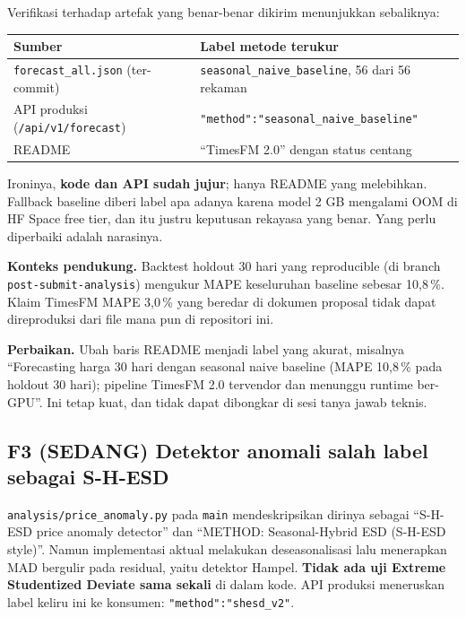 \documentclass[11pt,a4paper]{article}
\newcommand{\code}[1]{\texttt{\small #1}}
\newcommand{\sevM}{\textcolor{sevmed}{\textbf{SEDANG}}}
\begin{document}
\noindent
Verifikasi terhadap artefak yang benar-benar dikirim menunjukkan sebaliknya:

\begin{center}
\begin{tabular}{@{}p{6.4cm}p{8.6cm}@{}}
\toprule
\textbf{Sumber} & \textbf{Label metode terukur} \\
\midrule
\code{forecast\_all.json} (ter-commit) & \code{seasonal\_naive\_baseline}, 56 dari 56 rekaman \\
API produksi (\code{/api/v1/forecast}) & \code{"method":"seasonal\_naive\_baseline"} \\
README & ``TimesFM 2.0'' dengan status centang \\
\bottomrule
\end{tabular}
\end{center}

\noindent
Ironinya, \textbf{kode dan API sudah jujur}; hanya README yang melebihkan. Fallback baseline
diberi label apa adanya karena model 2 GB mengalami OOM di HF Space free tier, dan itu justru
keputusan rekayasa yang benar. Yang perlu diperbaiki adalah narasinya.

\noindent
\textbf{Konteks pendukung.} Backtest holdout 30 hari yang reproducible (di branch
\code{post-submit-analysis}) mengukur MAPE keseluruhan baseline sebesar 10,8\,\%. Klaim TimesFM
MAPE 3,0\,\% yang beredar di dokumen proposal tidak dapat direproduksi dari file mana pun di
repositori ini.

\noindent
\textbf{Perbaikan.} Ubah baris README menjadi label yang akurat, misalnya ``Forecasting harga 30
hari dengan seasonal naive baseline (MAPE 10,8\,\% pada holdout 30 hari); pipeline TimesFM 2.0
tervendor dan menunggu runtime ber-GPU''. Ini tetap kuat, dan tidak dapat dibongkar di sesi tanya
jawab teknis.

\subsection{F3 (\sevM) Detektor anomali salah label sebagai S-H-ESD}
\label{sec:f3}

\code{analysis/price\_anomaly.py} pada \code{main} mendeskripsikan dirinya sebagai
``S-H-ESD price anomaly detector'' dan ``METHOD: Seasonal-Hybrid ESD (S-H-ESD style)''. Namun
implementasi aktual melakukan deseasonalisasi lalu menerapkan MAD bergulir pada residual, yaitu
detektor Hampel. \textbf{Tidak ada uji Extreme Studentized Deviate sama sekali} di dalam kode.
API produksi meneruskan label keliru ini ke konsumen: \code{"method":"shesd\_v2"}.
\end{document}
